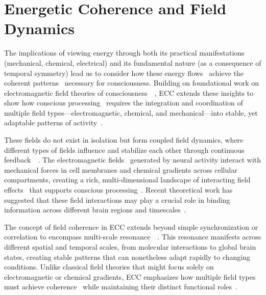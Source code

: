 \section{Energetic Coherence and Field Dynamics~}

The implications of viewing energy through both its practical manifestations (mechanical, chemical, electrical) and its fundamental nature (as a consequence of temporal symmetry) lead us to consider how these energy flows~ achieve the coherent patterns~ necessary for consciousness. Building on foundational work on electromagnetic field theories of consciousness~~\cite{mcfadden2020integrating, pockett2012electromagnetic}, ECC extends these insights to show how conscious processing~ requires the integration and coordination of multiple field types—electromagnetic, chemical, and mechanical—into stable, yet adaptable patterns of activity~\cite{pinotsis2023cytoelectric, pinotsis2023vivo}.

These fields do not exist in isolation but form coupled field dynamics, where different types of fields influence and stabilize each other through continuous feedback~~\cite{hunt2024electromagnetic}. The electromagnetic fields~ generated by neural activity interact with mechanical forces in cell membranes and chemical gradients across cellular compartments, creating a rich, multi-dimensional landscape of interacting field effects~ that supports conscious processing~\cite{da2024mathematical}. Recent theoretical work has suggested that these field interactions may play a crucial role in binding information across different brain regions and timescales~\cite{van2025processes}.

The concept of field coherence in ECC extends beyond simple synchronization or correlation to encompass multi-scale resonance~~\cite{breakspear2005dynamics}. This resonance manifests across different spatial and temporal scales, from molecular interactions to global brain states, creating stable patterns that can nonetheless adapt rapidly to changing conditions. Unlike classical field theories that might focus solely on electromagnetic or chemical gradients, ECC emphasizes how multiple field types must achieve coherence~ while maintaining their distinct functional roles~\cite{freeman2007}.

